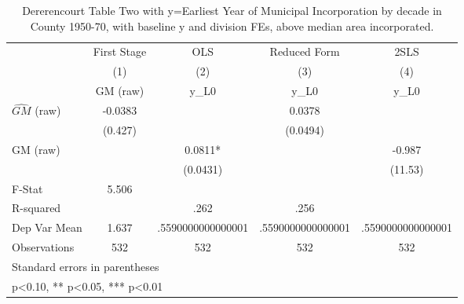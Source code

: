 \begin{table}[htbp]\centering
\def\sym#1{\ifmmode^{#1}\else\(^{#1}\)\fi}
\caption{Dererencourt Table Two with y=Earliest Year of Municipal Incorporation by decade in County 1950-70, with baseline y and division FEs, above median area incorporated.}
\begin{tabular}{l*{4}{c}}
\toprule
                    & First Stage   &         OLS   &Reduced Form   &        2SLS   \\
                    &\multicolumn{1}{c}{(1)}&\multicolumn{1}{c}{(2)}&\multicolumn{1}{c}{(3)}&\multicolumn{1}{c}{(4)}\\
                    &\multicolumn{1}{c}{GM  (raw)}&\multicolumn{1}{c}{y\_L0}&\multicolumn{1}{c}{y\_L0}&\multicolumn{1}{c}{y\_L0}\\
\midrule
$\hat{GM}$ (raw)    &     -0.0383   &               &      0.0378   &               \\
                    &     (0.427)   &               &    (0.0494)   &               \\
\addlinespace
GM  (raw)           &               &      0.0811*  &               &      -0.987   \\
                    &               &    (0.0431)   &               &     (11.53)   \\
\midrule
F-Stat              &       5.506   &               &               &               \\
R-squared           &               &        .262   &        .256   &               \\
Dep Var Mean        &       1.637   &.5590000000000001   &.5590000000000001   &.5590000000000001   \\
Observations        &         532   &         532   &         532   &         532   \\
\bottomrule
\multicolumn{5}{l}{\footnotesize Standard errors in parentheses}\\
\multicolumn{5}{l}{\footnotesize * p<0.10, ** p<0.05, *** p<0.01}\\
\end{tabular}
\end{table}
